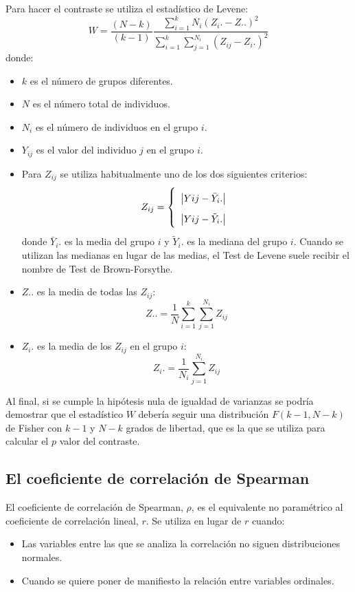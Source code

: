 Para hacer el contraste se utiliza el estadístico de Levene:
\[
W = \frac{{\left( {N - k} \right)}}{{\left( {k - 1} \right)}}\frac{{\sum\limits_{i = 1}^k {N_i \left( {Z_i . - Z..} \right)} ^2
}}{{\sum\limits_{i = 1}^k {\sum\limits_{j = 1}^{N_i } {\left( {Z_{ij}  - Z_i .} \right)^2 } } }} 
\]
donde:
\begin{itemize}
\item $k$ es el número de grupos diferentes.
\item $N$ es el número total de individuos.
\item $N_i$ es el número de individuos en el grupo $i$.
\item $Y_{ij}$ es el valor del individuo $j$ en el grupo $i$.
\item Para $Z_{ij}$ se utiliza habitualmente uno de los dos siguientes criterios:
\[
\renewcommand{\arraystretch}{1.8}
Z_{ij}  = \left\{ {\begin{array}{*{20}c}
   {\left| {Yij - \bar Y_i .} \right|}  \\
   {\left| {Yij - \tilde Y_i .} \right|}  \\
\end{array}} \right.
\]
donde $\bar Y_i .$ es la media del grupo $i$ y $\tilde Y_i .$ es la mediana del grupo $i$. Cuando se utilizan las medianas en lugar de las
medias, el Test de Levene suele recibir el nombre de Test de Brown-Forsythe.
\item $Z..$ es la media de todas las $Z_{ij}$:
\[
Z.. = \frac{1}{N}\sum\limits_{i = 1}^k {\sum\limits_{j = 1}^{N_i } {Z_{ij} } }
\]
\item $Z_i.$ es la media de los $Z_{ij}$ en el grupo $i$:
\[
Z_i . = \frac{1}{{N_i }}\sum\limits_{j = 1}^{N_i } {Z_{ij} }
\]
\end{itemize}

Al final, si se cumple la hipótesis nula de igualdad de varianzas se podría demostrar que el estadístico $W$ debería seguir una distribución
$F(k-1,N-k)$ de Fisher con $k-1$ y $N-k$ grados de libertad, que es la que se utiliza para calcular el $p$ valor del contraste.


\subsection{El coeficiente de correlación de Spearman}
El coeficiente de correlación de Spearman, $\rho$, es el equivalente no paramétrico al coeficiente de correlación lineal, $r$. Se utiliza en
lugar de $r$ cuando:
\begin{itemize}
\item Las variables entre las que se analiza la correlación no siguen distribuciones normales.
\item Cuando se quiere poner de manifiesto la relación entre variables ordinales.
\end{itemize}

